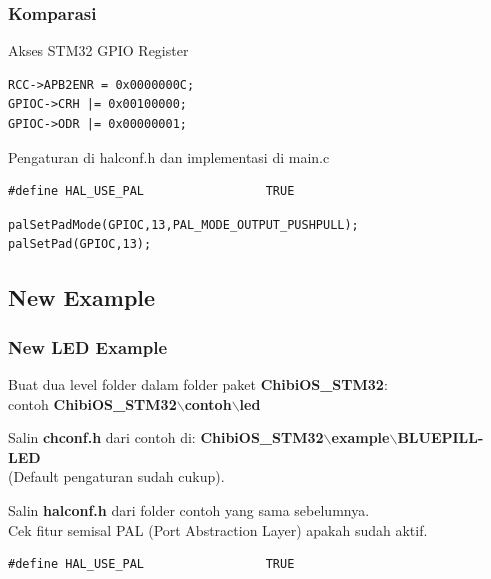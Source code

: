 \documentclass[table,dvipsnames]{beamer}
\begin{document}
	\begin{frame}[fragile]
		\frametitle{Komparasi}
		\begin{exampleblock}{}
			Akses STM32 GPIO Register
			\begin{verbatim}
RCC->APB2ENR = 0x0000000C;
GPIOC->CRH |= 0x00100000;
GPIOC->ODR |= 0x00000001;
			\end{verbatim}
		\end{exampleblock}

		\begin{exampleblock}{}
			Pengaturan di halconf.h dan implementasi di main.c
			\begin{exampleblock}{}
				\begin{verbatim}
#define HAL_USE_PAL                 TRUE
				\end{verbatim}
			\end{exampleblock}

			\begin{exampleblock}{}
				\begin{verbatim}
palSetPadMode(GPIOC,13,PAL_MODE_OUTPUT_PUSHPULL);
palSetPad(GPIOC,13);
				\end{verbatim}
			\end{exampleblock}
		\end{exampleblock}
	\end{frame}

	\subsection{New Example}
	\begin{frame}[fragile]
		\frametitle{New LED Example}
		\begin{exampleblock}{}
			Buat dua level folder dalam folder paket \textbf{ChibiOS\_STM32}:\\
			contoh \textbf{ChibiOS\_STM32$\backslash$contoh$\backslash$led}
		\end{exampleblock}

		\begin{exampleblock}{}
			Salin \textbf{chconf.h} dari contoh di:
			\textbf{ChibiOS\_STM32$\backslash$example$\backslash$BLUEPILL-LED}\\
			(Default pengaturan sudah cukup).
		\end{exampleblock}

		\begin{exampleblock}{}
			Salin \textbf{halconf.h} dari folder contoh yang sama sebelumnya.\\
			Cek fitur semisal PAL (Port Abstraction Layer) apakah sudah aktif.
			\begin{verbatim}
#define HAL_USE_PAL                 TRUE
			\end{verbatim}
		\end{exampleblock}
	\end{frame}
\end{document}

